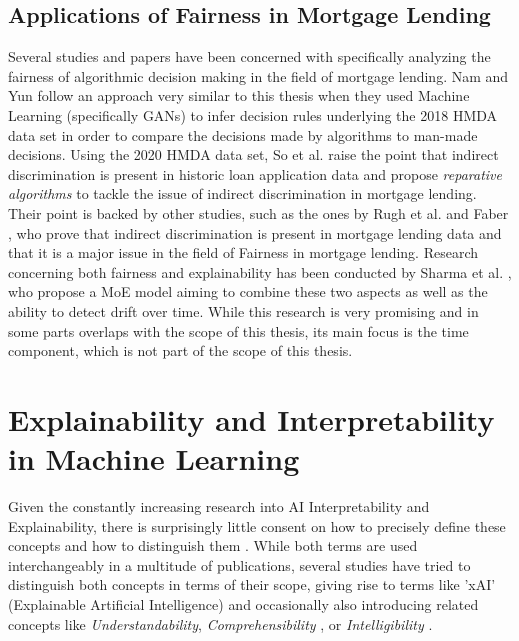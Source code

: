\subsection{Applications of Fairness in Mortgage Lending}\label{subsec:mortgage_lending_fairness}

Several studies and papers have been concerned with specifically analyzing the fairness of algorithmic decision making in the field of mortgage lending.
Nam and Yun \parencite{Nam2022} follow an approach very similar to this thesis when they used Machine Learning (specifically GANs) to infer decision rules underlying the 2018 HMDA data set in order to compare the decisions made by algorithms to man-made decisions.
Using the 2020 HMDA data set, So et al. \parencite{So2022} raise the point that indirect discrimination is present in historic loan application data and propose \textit{reparative algorithms} to tackle the issue of indirect discrimination in mortgage lending.
Their point is backed by other studies, such as the ones by Rugh et al. \parencite{Rugh2015} and Faber \parencite{Faber2013}, who prove that indirect discrimination is present in mortgage lending data and that it is a major issue in the field of Fairness in mortgage lending.
Research concerning both fairness and explainability has been conducted by Sharma et al. \parencite{Sharma2022}, who propose a MoE model aiming to combine these two aspects as well as the ability to detect drift over time.
While this research is very promising and in some parts overlaps with the scope of this thesis, its main focus is the time component, which is not part of the scope of this thesis.

\section{Explainability and Interpretability in Machine Learning}\label{sec:explainability}

Given the constantly increasing research into AI Interpretability and Explainability, there is surprisingly little consent on how to precisely define these concepts and how to distinguish them \parencite{Linardatos2021}. 
While both terms are used interchangeably in a multitude of publications, several studies have tried to distinguish both concepts in terms of their scope, giving rise to terms like 'xAI' (Explainable Artificial Intelligence) \parencite{Gunning2019} and occasionally also introducing related concepts like \textit{Understandability}, \textit{Comprehensibility} \parencite{Guidotti2018}, or \textit{Intelligibility} \parencite{Caruana2015}.

